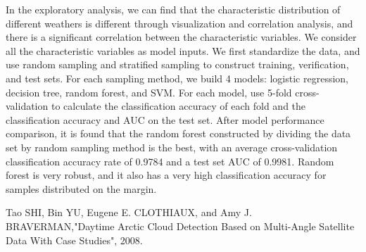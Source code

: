 \documentclass[11pt]{article}
\begin{document}
In the exploratory analysis, we can find that the characteristic distribution of different weathers is different through visualization and correlation analysis, and there is a significant correlation between the characteristic variables. We consider all the characteristic variables as model inputs. We first standardize the data, and use random sampling and stratified sampling to construct training, verification, and test sets. For each sampling method, we build 4 models: logistic regression, decision tree, random forest, and SVM. For each model, use 5-fold cross-validation to calculate the classification accuracy of each fold and the classification accuracy and AUC on the test set. After model performance comparison, it is found that the random forest constructed by dividing the data set by random sampling method is the best, with an average cross-validation classification accuracy rate of 0.9784 and a test set AUC of 0.9981. Random forest is very robust, and it also has a very high classification accuracy for samples distributed on the margin.

\bigskip


Tao SHI, Bin YU, Eugene E. CLOTHIAUX, and Amy J. BRAVERMAN,"Daytime Arctic Cloud Detection Based on Multi-Angle Satellite Data With Case Studies", 2008.





\end{document}
